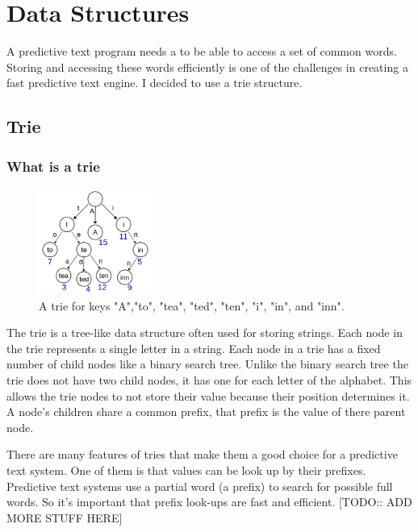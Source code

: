 \documentclass[10pt]{article} %
\begin{document}
	\section{Data Structures}
		A predictive text program needs a to be able to access a set of common words.
		 Storing and accessing these words efficiently is one of the challenges in creating a fast predictive text engine.
		  I decided to use a trie\cite{book:ADS:trie} structure.
		  
		\subsection{Trie}
			\subsubsection{What is a trie}
			
				\begin{figure} %
    				\centering
    				\includegraphics[width=0.33\textwidth]{Trie_example}
    				\caption{A trie for keys "A","to", "tea", "ted", "ten", "i", "in", and "inn"\cite{fig:Trie_example}.}
    				\label{fig:Trie_example}
				\end{figure}
				
				The trie is a tree-like data structure often used for storing strings. Each node in the trie represents a single letter in a string. Each node in a trie has a fixed number of child nodes like a binary search tree. Unlike the binary search tree the trie does not have two child nodes, it has one for each letter of the alphabet. This allows the trie nodes to not store their value because their position determines it. A node's children share a common prefix, that prefix is the value of there parent node.

                There are many features of tries that make them a good choice for a predictive text system. One of them is that values can be look up by their prefixes. Predictive text systems use a partial word (a prefix) to search for possible full words. So it's important that prefix look-ups are fast and efficient. [TODO:: ADD MORE STUFF HERE]
				
\end{document}
